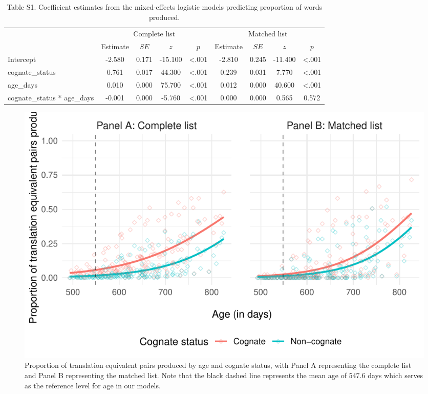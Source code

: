 \documentclass[
  ,man,floatsintext]{apa6}
\begin{document}
\begin{table}[tbp]

\begin{center}
\begin{threeparttable}

\caption{\label{tab:Table S1}Table S1. Coefficient estimates from the mixed-effects logistic models predicting proportion of words produced.}

\begin{tabular}{lcccccccc}
\toprule
 & \multicolumn{4}{c}{Complete list} & \multicolumn{4}{c}{Matched list} \\
\cmidrule(r){2-5} \cmidrule(r){6-9}
 & Estimate & $SE$ & $z$ & $p$ & Estimate & $SE$ & $z$ & $p$\\
\midrule
Intercept & -2.580 & 0.171 & -15.100 & <.001 & -2.810 & 0.245 & -11.400 & <.001\\
cognate\_status & 0.761 & 0.017 & 44.300 & <.001 & 0.239 & 0.031 & 7.770 & <.001\\
age\_days & 0.010 & 0.000 & 75.700 & <.001 & 0.012 & 0.000 & 40.600 & <.001\\
cognate\_status * age\_days & -0.001 & 0.000 & -5.760 & <.001 & 0.000 & 0.000 & 0.565 & 0.572\\
\bottomrule
\end{tabular}

\end{threeparttable}
\end{center}

\end{table}

\begin{figure}

{\centering \includegraphics[width=1.2\linewidth]{CogVocab_supplemental_files/figure-latex/FigS2-1} 

}

\caption{Proportion of translation equivalent pairs produced by age and cognate status, with Panel A representing the complete list and Panel B representing the matched list. Note that the black dashed line represents the mean age of 547.6 days which serves as the reference level for age in our models.}\label{fig:FigS2}
\end{figure}
\end{document}
